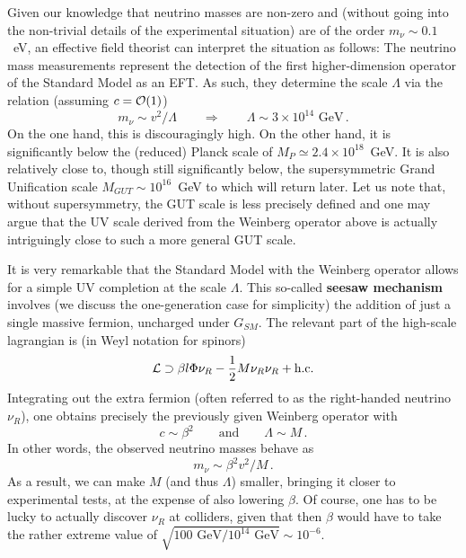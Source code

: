 \documentclass[12pt]{article}
\newcommand{\be}{\begin{equation}}
\newcommand{\ee}{\end{equation}}
\numberwithin{equation}{section}
\begin{document}
Given our knowledge that neutrino masses are non-zero and (without going into the non-trivial details of the experimental situation) are of the order $m_\nu\sim 0.1$~eV, an effective field theorist can interpret the situation as follows: The neutrino mass measurements represent the detection of the first higher-dimension operator of the Standard Model as an EFT. As such, they determine the scale $\Lambda$ via the relation (assuming $c={\cal O}(1)$) 
\be
m_\nu\sim v^2/\Lambda\qquad\Rightarrow \qquad \Lambda\sim 3\times 10^{14}\,\,\mbox{GeV}\,.
\ee
On the one hand, this is discouragingly high. On the other hand, it is significantly below the (reduced) Planck scale of $M_P\simeq 2.4\times 10^{18}$~GeV. It is also relatively close to, though still significantly below, the supersymmetric Grand Unification scale $M_{GUT}\sim 10^{16}$~GeV to which will return later. Let us note that, without supersymmetry, the GUT scale is less precisely defined and one may argue that the UV scale derived from the Weinberg operator above is actually intriguingly close to such a more general GUT scale. 

It is very remarkable that the Standard Model with the Weinberg operator allows for a simple UV completion at the scale $\Lambda$. This so-called {\bf seesaw mechanism} \cite{Minkowski:1977sc, Yanagida:1979as, GellMann:1980vs}  involves (we discuss the one-generation case for simplicity) the addition of just a single massive fermion, uncharged under $G_{SM}$. The relevant part of the high-scale lagrangian is (in Weyl notation for spinors)
\be
{\cal L}\supset \beta l\Phi\nu_R-\frac{1}{2}M\nu_R\nu_R+\mbox{h.c.}\label{ses}
\ee
Integrating out the extra fermion (often referred to as the right-handed neutrino $\nu_R$), one obtains precisely the previously given Weinberg operator with 
\be
c\sim \beta^2\qquad \mbox{and}\qquad \Lambda\sim M\,.
\ee
In other words, the observed neutrino masses behave as 
\be
m_\nu\sim \beta^2v^2/M\,.
\ee
As a result, we can make $M$ (and thus $\Lambda$) smaller, bringing it closer to experimental tests, at the expense of also lowering $\beta$. Of course, one has to be lucky to actually discover $\nu_R$ at colliders, given that then $\beta$ would have to take the rather extreme value of $\sqrt{100\,\,\mbox{GeV}/ 10^{14}\,\,\mbox{GeV}}\sim 10^{-6}$.
\end{document}
